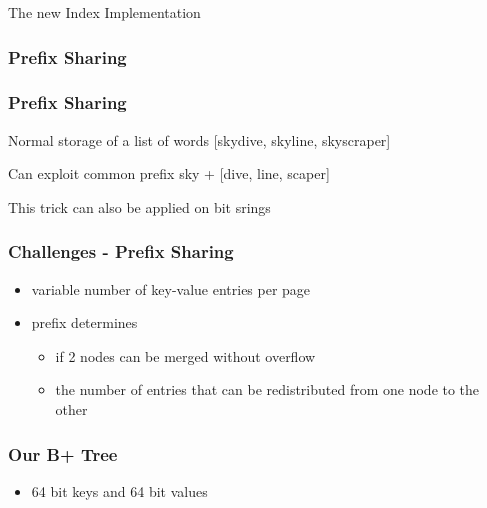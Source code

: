 \documentclass{beamer}
\begin{document}
\begin{section}{The new Index Implementation}
    \begin{frame}
      \frametitle{Prefix Sharing}
      \pause
    \end{frame}
    \begin{frame}
      \frametitle{Prefix Sharing}
      \begin{block} {Normal storage of a list of words}
      [skydive, skyline, skyscraper] 
      \end{block}
      \begin{block} {Can exploit common prefix}
      sky + [dive, line, scaper]
      \end{block}
      This trick can also be applied on bit srings
    \end{frame}
    \begin{frame}
        \frametitle{Challenges - Prefix Sharing}
        \begin{itemize}
            \item variable number of key-value entries per page
            \item prefix determines
            \begin{itemize}
                \item if 2 nodes can be merged without overflow
                \item the number of entries that can be redistributed from one node to the other
            \end{itemize}
        \end{itemize}    
    \end{frame}
    \begin{frame}
      \frametitle{Our B+ Tree}
      \begin{itemize}
        \item 64 bit keys and 64 bit values

\end{itemize}
\end{frame}
\end{section}
\end{document}
